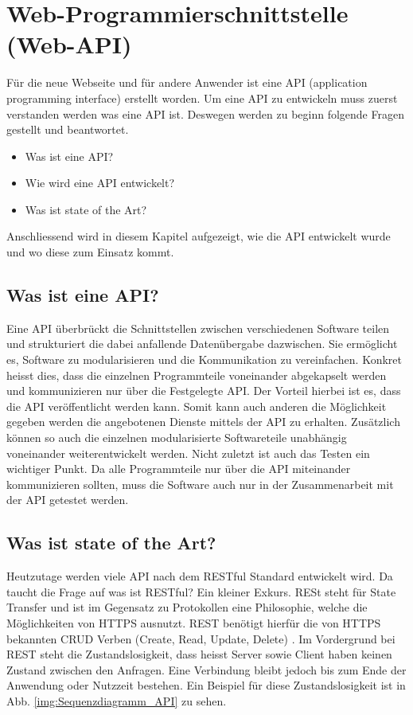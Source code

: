 \section{ Web-Programmierschnittstelle (Web-API)}
Für die neue Webseite und für andere Anwender ist eine API (application programming interface) erstellt worden. Um eine API zu entwickeln muss zuerst verstanden werden was eine API ist. Deswegen werden zu beginn folgende Fragen gestellt und beantwortet.
\begin{itemize}
\item Was ist eine API?
\item Wie wird eine API entwickelt?
\item Was ist state of the Art?
\end{itemize}

Anschliessend wird in diesem Kapitel aufgezeigt, wie die API entwickelt wurde und wo diese zum Einsatz kommt.

\subsection{Was ist eine API?}
Eine API überbrückt die Schnittstellen zwischen verschiedenen Software teilen und strukturiert die dabei anfallende Datenübergabe dazwischen. Sie ermöglicht es, Software zu modularisieren und die Kommunikation zu vereinfachen. Konkret heisst dies, dass die einzelnen Programmteile  voneinander abgekapselt werden und kommunizieren nur über die Festgelegte API. Der Vorteil hierbei ist es, dass die API veröffentlicht werden kann. Somit kann auch anderen die Möglichkeit gegeben werden die angebotenen Dienste mittels der API zu erhalten. Zusätzlich können so auch die einzelnen modularisierte Softwareteile unabhängig voneinander weiterentwickelt werden. Nicht zuletzt ist auch das Testen ein wichtiger Punkt. Da alle Programmteile nur über die API miteinander kommunizieren sollten, muss die Software auch nur in der Zusammenarbeit mit der API getestet werden.

\subsection{Was ist state of the Art?}
Heutzutage werden viele API nach dem RESTful Standard entwickelt wird. Da taucht die Frage auf was ist RESTful? Ein kleiner Exkurs. RESt steht für State Transfer und ist im Gegensatz zu Protokollen eine Philosophie, welche die Möglichkeiten von HTTPS ausnutzt. REST benötigt hierfür die von HTTPS bekannten CRUD Verben (Create, Read, Update, Delete) \cite{LornaJaneMitchell2013oreilly}. Im Vordergrund bei REST steht die Zustandslosigkeit, dass heisst Server sowie Client haben keinen Zustand zwischen den Anfragen. Eine Verbindung bleibt jedoch bis zum Ende der Anwendung oder Nutzzeit bestehen. Ein Beispiel für diese Zustandslosigkeit ist in Abb. \ref{img:Sequenzdiagramm_API} zu sehen.\\

